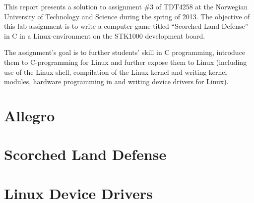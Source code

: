 This report presents a solution to assignment \#3 of TDT4258 at the Norwegian University of Technology and Science during the spring of 2013. The objective of this lab assignment is to write a computer game titled ``Scorched Land Defense'' in C in a Linux-environment on the STK1000 development board. 

The assignment's goal is to further students' skill in C programming, introduce them to C-programming for Linux and further expose them to Linux (including use of the Linux shell, compilation of the Linux kernel and writing kernel modules, hardware programming in and writing device drivers for Linux).

\section{Allegro}
	

\section{Scorched Land Defense}
	

\section{Linux Device Drivers}
	
	